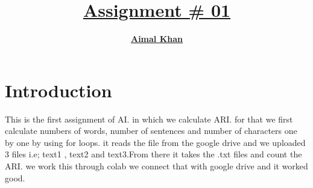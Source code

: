 \documentclass{article}
\title{\textbf{\underline{Assignment # 01}}}
\author{\textbf{\underline{Aimal Khan}}}
\begin{document}
\maketitle



\section{Introduction}
This is the first assignment of AI. in which we calculate ARI.
for that we first calculate numbers of words, number of sentences and number of characters one by one by using for loops.
it reads the file from the google drive and we uploaded 3 files i.e; text1 , text2 and text3.From there it takes the .txt files and count the ARI. we work this through colab we connect that with google drive and it worked good.
\end{document}
